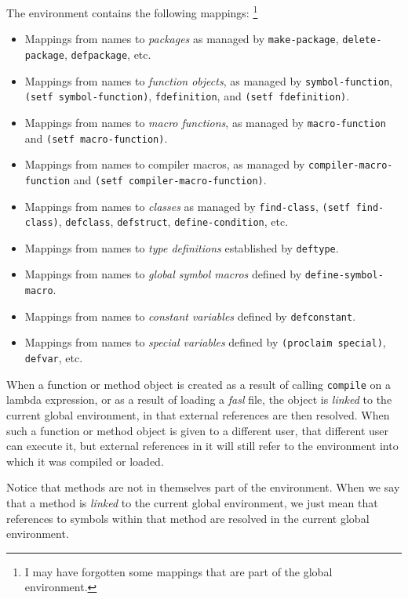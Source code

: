 The environment contains the following mappings:%
\footnote{I may have forgotten some mappings that are part of the
  global environment.}


\begin{itemize}
\item Mappings from names to \emph{packages} as managed by
  \texttt{make-package}, \texttt{delete-package}, \texttt{defpackage},
  etc. 
\item Mappings from names to \emph{function objects}, as managed by
  \texttt{symbol-function}, \texttt{(setf symbol-function)},
  \texttt{fdefinition}, and \texttt{(setf fdefinition)}.
\item Mappings from names to \emph{macro functions}, as managed by 
\texttt{macro-function} and \texttt{(setf macro-function)}.
\item Mappings from names to compiler macros, as managed by
  \texttt{compiler-macro-function} and \texttt{(setf
    compiler-macro-function)}. 
\item Mappings from names to \emph{classes} as managed by
  \texttt{find-class}, \texttt{(setf find-class)}, \texttt{defclass},
  \texttt{defstruct}, \texttt{define-condition}, etc. 
\item Mappings from names to \emph{type definitions} established by
  \texttt{deftype}. 
\item Mappings from names to \emph{global symbol macros} defined by
  \texttt{define-symbol-macro}.
\item Mappings from names to \emph{constant variables} defined by
  \texttt{defconstant}.
\item Mappings from names to \emph{special variables} defined by
  \texttt{(proclaim special)}, \texttt{defvar}, etc. 
\end{itemize}

When a function or method object is created as a result of calling
\texttt{compile} on a lambda expression, or as a result of loading a
\emph{fasl} file, the object is \emph{linked} to the current global
environment, in that external references are then resolved.  When such
a function or method object is given to a different user, that
different user can execute it, but external references in it will
still refer to the environment into which it was compiled or loaded.

Notice that methods are not in themselves part of the environment.
When we say that a method is \emph{linked} to the current global
environment, we just mean that references to symbols within that
method are resolved in the current global environment.  

